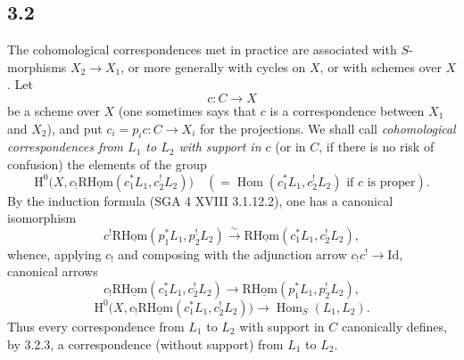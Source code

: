 \documentclass[11pt]{article}
\renewcommand{\H}{\mathrm{H}}
\DeclareMathOperator{\Hom}{Hom}
\providecommand{\Id}{\mathrm{Id}}
\providecommand{\Hom}{\operatorname{Hom}}
\providecommand{\Hom}{\operatorname{Hom}}
\begin{document}
\subsection*{3.2}
The cohomological correspondences met in practice are associated with $S$-morphisms $X_2\to X_1$, or more generally with cycles on $X$, or with schemes over $X$. Let
\[
c:C\longrightarrow X
\]
be a scheme over $X$ (one sometimes says that $c$ is a correspondence between $X_1$ and $X_2$), and put $c_i=p_ic:C\to X_i$ for the projections. We shall call \emph{cohomological correspondences from $L_1$ to $L_2$ with support in $c$} (or in $C$, if there is no risk of confusion) the elements of the group
\[
\H^0\bigl(X,c_!\mathrm{R}\underline{\mathrm{Hom}}(c_1^*L_1,c_2^!L_2)\bigr)
\quad(=\Hom(c_1^*L_1,c_2^!L_2)\text{ if }c\text{ is proper}).
\]
By the induction formula (SGA 4 XVIII 3.1.12.2), one has a canonical isomorphism
\begin{equation}
c^!\mathrm{R}\underline{\mathrm{Hom}}(p_1^*L_1,p_2^!L_2)
\xrightarrow{\sim}
\mathrm{R}\underline{\mathrm{Hom}}(c_1^*L_1,c_2^!L_2),
\tag{3.2.1}
\end{equation}
whence, applying $c_!$ and composing with the adjunction arrow $c_!c^!\to \Id$, canonical arrows
\begin{equation}
c_!\mathrm{R}\underline{\mathrm{Hom}}(c_1^*L_1,c_2^!L_2)
\longrightarrow
\mathrm{R}\underline{\mathrm{Hom}}(p_1^*L_1,p_2^!L_2),
\tag{3.2.2}
\end{equation}
\begin{equation}
\H^0\bigl(X,c_!\mathrm{R}\underline{\mathrm{Hom}}(c_1^*L_1,c_2^!L_2)\bigr)
\longrightarrow
\Hom_S(L_1,L_2).
\tag{3.2.3}
\end{equation}
Thus every correspondence from $L_1$ to $L_2$ with support in $C$ canonically defines, by 3.2.3, a correspondence (without support) from $L_1$ to $L_2$.
\end{document}
